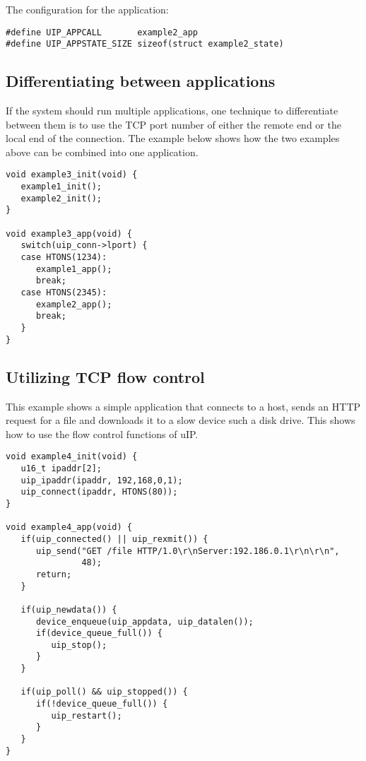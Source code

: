 The configuration for the application:



\footnotesize\begin{verbatim}#define UIP_APPCALL       example2_app
#define UIP_APPSTATE_SIZE sizeof(struct example2_state)
\end{verbatim}
\normalsize
\hypertarget{main_example3}{}\subsection{Differentiating between applications}\label{main_example3}
If the system should run multiple applications, one technique to differentiate between them is to use the TCP port number of either the remote end or the local end of the connection. The example below shows how the two examples above can be combined into one application.



\footnotesize\begin{verbatim}void example3_init(void) {
   example1_init();
   example2_init();   
}

void example3_app(void) {
   switch(uip_conn->lport) {
   case HTONS(1234):
      example1_app();
      break;
   case HTONS(2345):
      example2_app();
      break;
   }
}
\end{verbatim}
\normalsize
\hypertarget{main_example4}{}\subsection{Utilizing TCP flow control}\label{main_example4}
This example shows a simple application that connects to a host, sends an HTTP request for a file and downloads it to a slow device such a disk drive. This shows how to use the flow control functions of u\-IP.



\footnotesize\begin{verbatim}void example4_init(void) {
   u16_t ipaddr[2];
   uip_ipaddr(ipaddr, 192,168,0,1);
   uip_connect(ipaddr, HTONS(80));
}

void example4_app(void) {
   if(uip_connected() || uip_rexmit()) {
      uip_send("GET /file HTTP/1.0\r\nServer:192.186.0.1\r\n\r\n",
               48);
      return;
   }

   if(uip_newdata()) {
      device_enqueue(uip_appdata, uip_datalen());
      if(device_queue_full()) {
         uip_stop();
      }
   }

   if(uip_poll() && uip_stopped()) {
      if(!device_queue_full()) {
         uip_restart();
      }
   }
}
\end{verbatim}
\normalsize


